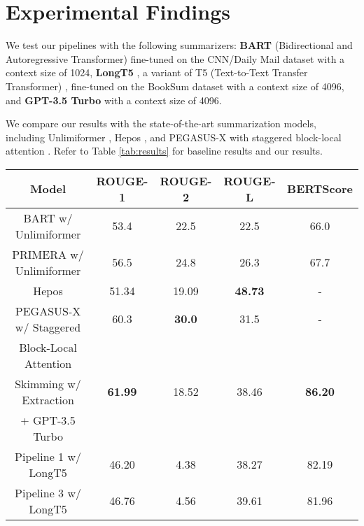 \section{Experimental Findings}
\label{sec:findings}

We test our pipelines with the following summarizers: \textbf{BART} (Bidirectional
and Autoregressive Transformer) \cite{lewis-etal-2020-bart} fine-tuned on the
CNN/Daily Mail dataset \cite{nallapati2016abstractive} with a context size of 1024,
\textbf{LongT5} \cite{guo2021longt5}, a variant of T5 (Text-to-Text Transfer
Transformer) \cite{raffel2020exploring}, fine-tuned on the BookSum dataset with
a context size of 4096, and \textbf{GPT-3.5 Turbo} \cite{brown2020language} with a
context size of 4096.

We compare our results with the state-of-the-art summarization models, including
Unlimiformer \cite{bertsch2023unlimiformer}, Hepos \cite{huang-etal-2021-efficient},
and PEGASUS-X with staggered block-local attention \cite{phang2022investigating}.
Refer to Table \ref{tab:results} for baseline results and our results.

\begin{table*}[!ht]
	\centering

	\begin{tabular}{c c c c c}
		\hline
		\textbf{Model} & \textbf{ROUGE-1} & \textbf{ROUGE-2} & \textbf{ROUGE-L} &
		\textbf{BERTScore} \\
		\hline
		BART w/ Unlimiformer & 53.4 & 22.5 & 22.5 & 66.0 \\
		PRIMERA w/ Unlimiformer & 56.5 & 24.8 & 26.3 & 67.7 \\
		Hepos & 51.34 & 19.09 & \textbf{48.73} & - \\
		PEGASUS-X w/ Staggered & 60.3 & \textbf{30.0} & 31.5 & - \\
		Block-Local Attention & & & & \\
		\hline
		Skimming w/ Extraction & \textbf{61.99} & 18.52 & 38.46 & \textbf{86.20} \\
		+ GPT-3.5 Turbo & & & & \\
		Pipeline 1 w/ LongT5 & 46.20 & 4.38 & 38.27 & 82.19 \\
		Pipeline 3 w/ LongT5 & 46.76 & 4.56 & 39.61 & 81.96 \\
		\hline
	\end{tabular}

	\caption{Automatic evaluation results on GovReport dataset. The best scores are
	highlighted in \textbf{bold}.}
	\label{tab:results}
\end{table*}
